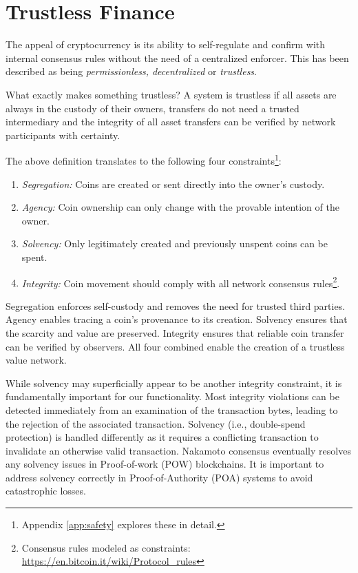 \documentclass[12pt,a4paper]{article}
\begin{document}
\section{Trustless Finance}

The appeal of cryptocurrency is its ability to self-regulate and confirm with internal consensus rules without the need of a centralized enforcer. This has been described as being \emph{permissionless, decentralized} or \emph{trustless}.

What exactly makes something trustless? A system is trustless if all assets are always in the custody of their owners, transfers do not need a trusted intermediary and the integrity of all asset transfers can be verified by network participants with certainty.

The above definition translates to the following four constraints\footnote{Appendix \ref{app:safety} explores these in detail.}:
\begin{enumerate}
    \item \emph{Segregation:} Coins are created or sent directly into the owner’s custody.
    \item \emph{Agency:} Coin ownership can only change with the provable intention of the owner.
    \item \emph{Solvency:} Only legitimately created and previously unspent coins can be spent.
    \item \emph{Integrity:} Coin movement should comply with all network consensus rules\footnote{Consensus rules modeled as constraints:                             \url{https://en.bitcoin.it/wiki/Protocol_rules}}.
\end{enumerate}
Segregation enforces self-custody and removes the need for trusted third parties. Agency enables tracing a coin’s provenance to its creation. Solvency ensures that the scarcity and value are preserved. Integrity ensures that reliable coin transfer can be verified by observers. All four combined enable the creation of a trustless value network.

While solvency may superficially appear to be another integrity constraint, it is fundamentally important for our functionality. Most integrity violations can be detected immediately from an examination of the transaction bytes, leading to the rejection of the associated transaction. Solvency (i.e., double-spend protection) is handled differently as it requires a conflicting transaction to invalidate an otherwise valid transaction. Nakamoto consensus\cite{nakcons} eventually resolves any solvency issues in Proof-of-work (POW) blockchains\cite{DN93}. It is important to address solvency correctly in Proof-of-Authority (POA)\cite{parPOA} systems to avoid catastrophic losses.
\end{document}
